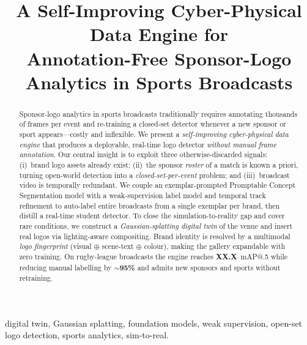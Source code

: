 \documentclass[conference]{IEEEtran}
\newcommand{\TODOnum}[1]{{\color{red}\textbf{#1}}}
\begin{document}
\title{A Self-Improving Cyber-Physical Data Engine for\\
Annotation-Free Sponsor-Logo Analytics in Sports Broadcasts}

\author{
}

\maketitle

\begin{abstract}
Sponsor-logo analytics in sports broadcasts traditionally requires annotating
thousands of frames per event and re-training a closed-set detector whenever a
new sponsor or sport appears---costly and inflexible. We present a
\emph{self-improving cyber-physical data engine} that produces a deployable,
real-time logo detector \emph{without manual frame annotation}. Our central
insight is to exploit three otherwise-discarded signals: (i)~brand logo assets
already exist; (ii)~the sponsor \emph{roster} of a match is known a priori,
turning open-world detection into a \emph{closed-set-per-event} problem; and
(iii)~broadcast video is temporally redundant. We couple an exemplar-prompted
Promptable Concept Segmentation model with a weak-supervision label model and
temporal track refinement to auto-label entire broadcasts from a single exemplar
per brand, then distill a real-time student detector. To close the
simulation-to-reality gap and cover rare conditions, we construct a
\emph{Gaussian-splatting digital twin} of the venue and insert real logos via
lighting-aware compositing. Brand identity is resolved by a multimodal
\emph{logo fingerprint} (visual $\oplus$ scene-text $\oplus$ colour), making the
gallery expandable with zero training. On rugby-league broadcasts the engine
reaches \TODOnum{XX.X}~mAP@.5 while reducing manual labelling by
\TODOnum{$\sim$95\%} and admits new sponsors and sports without retraining.
\end{abstract}

\begin{IEEEkeywords}
digital twin, Gaussian splatting, foundation models, weak supervision,
open-set logo detection, sports analytics, sim-to-real.
\end{IEEEkeywords}
\end{document}
